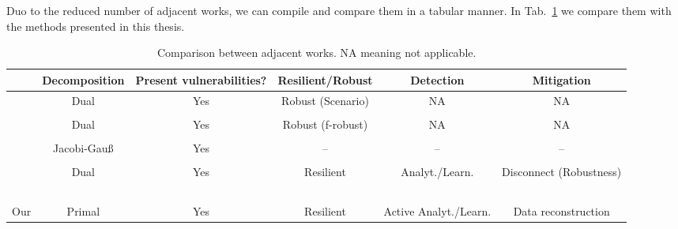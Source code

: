 \documentclass[../main.tex]{subfiles}
\begin{document}
Duo to the reduced number of adjacent works, we can compile and compare them in a tabular manner.
In Tab.~\ref{tab:compare_works} we compare them with the methods presented in this thesis.

\begin{landscape}
  \vspace*{\fill}
\begin{table}[H]
  \centering
  \begin{tabular}[h]{lccccc}
    \toprule
     & Decomposition & Present vulnerabilities?  & Resilient/Robust & Detection & Mitigation\\
    \midrule
    \parbox{20pt}{\cite{VelardeEtAl2017a}\\ \cite{MaestreEtAl2021}} & Dual & Yes & Robust (Scenario) & NA & NA\\\\
    \parbox{20pt}{\cite{VelardeEtAl2017b} \\ \cite{VelardeEtAl2018}} & Dual & Yes & Robust (f-robust) & NA & NA\\\\
    \cite{ChanfreutEtAl2018} & Jacobi-Gauß & Yes & -- & -- & --\\\\
    \parbox{40pt}{\cite{AnandutaEtAl2018}\\\cite{AnandutaEtAl2019}\\\cite{AnandutaEtAl2020}} & Dual & Yes & Resilient& Analyt./Learn. & Disconnect (Robustness)\\\\
    Our & Primal & Yes & Resilient & Active Analyt./Learn. & Data reconstruction\\
    \bottomrule
  \end{tabular}
  \caption[Comparison between adjacent works]{Comparison between adjacent works. NA meaning not applicable.}\label{tab:compare_works}
\end{table}
  \vspace*{\fill}
\end{landscape}
\end{document}
